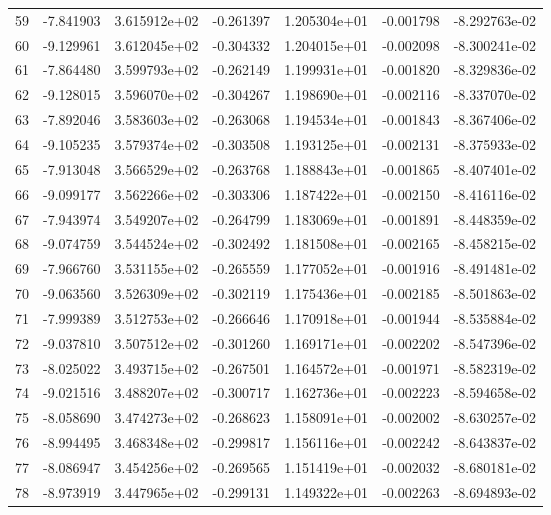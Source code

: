 \begin{tabular}{rrrrrrr}
  59 &  -7.841903 &  3.615912e+02 & -0.261397 &  1.205304e+01 &   -0.001798 & -8.292763e-02 \\
  60 &  -9.129961 &  3.612045e+02 & -0.304332 &  1.204015e+01 &   -0.002098 & -8.300241e-02 \\
  61 &  -7.864480 &  3.599793e+02 & -0.262149 &  1.199931e+01 &   -0.001820 & -8.329836e-02 \\
  62 &  -9.128015 &  3.596070e+02 & -0.304267 &  1.198690e+01 &   -0.002116 & -8.337070e-02 \\
  63 &  -7.892046 &  3.583603e+02 & -0.263068 &  1.194534e+01 &   -0.001843 & -8.367406e-02 \\
  64 &  -9.105235 &  3.579374e+02 & -0.303508 &  1.193125e+01 &   -0.002131 & -8.375933e-02 \\
  65 &  -7.913048 &  3.566529e+02 & -0.263768 &  1.188843e+01 &   -0.001865 & -8.407401e-02 \\
  66 &  -9.099177 &  3.562266e+02 & -0.303306 &  1.187422e+01 &   -0.002150 & -8.416116e-02 \\
  67 &  -7.943974 &  3.549207e+02 & -0.264799 &  1.183069e+01 &   -0.001891 & -8.448359e-02 \\
  68 &  -9.074759 &  3.544524e+02 & -0.302492 &  1.181508e+01 &   -0.002165 & -8.458215e-02 \\
  69 &  -7.966760 &  3.531155e+02 & -0.265559 &  1.177052e+01 &   -0.001916 & -8.491481e-02 \\
  70 &  -9.063560 &  3.526309e+02 & -0.302119 &  1.175436e+01 &   -0.002185 & -8.501863e-02 \\
  71 &  -7.999389 &  3.512753e+02 & -0.266646 &  1.170918e+01 &   -0.001944 & -8.535884e-02 \\
  72 &  -9.037810 &  3.507512e+02 & -0.301260 &  1.169171e+01 &   -0.002202 & -8.547396e-02 \\
  73 &  -8.025022 &  3.493715e+02 & -0.267501 &  1.164572e+01 &   -0.001971 & -8.582319e-02 \\
  74 &  -9.021516 &  3.488207e+02 & -0.300717 &  1.162736e+01 &   -0.002223 & -8.594658e-02 \\
  75 &  -8.058690 &  3.474273e+02 & -0.268623 &  1.158091e+01 &   -0.002002 & -8.630257e-02 \\
  76 &  -8.994495 &  3.468348e+02 & -0.299817 &  1.156116e+01 &   -0.002242 & -8.643837e-02 \\
  77 &  -8.086947 &  3.454256e+02 & -0.269565 &  1.151419e+01 &   -0.002032 & -8.680181e-02 \\
  78 &  -8.973919 &  3.447965e+02 & -0.299131 &  1.149322e+01 &   -0.002263 & -8.694893e-02 \\

\end{tabular}

